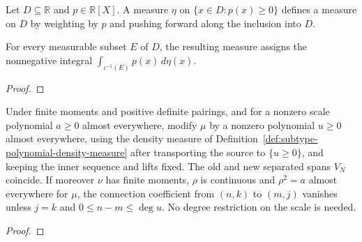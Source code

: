 \begin{supporting}
\begin{definition}
\label{def:subtype-polynomial-density-measure}
\leanok
Let $D\subseteq\mathbb R$ and $p\in\mathbb R[X]$. A measure $\eta$ on
$\{x\in D:p(x)\ge0\}$ defines a measure on $D$ by weighting by $p$ and
pushing forward along the inclusion into $D$.
\end{definition}

\begin{theorem}
\label{thm:subtype-polynomial-density-measure}
\leanok
For every measurable subset $E$ of $D$, the resulting measure assigns the
nonnegative integral $\int_{\iota^{-1}(E)}p(x)\,d\eta(x)$.
\end{theorem}
\begin{proof}
\leanok
\end{proof}
\end{supporting}


\begin{theorem}
\label{thm:koornwinder-type1}
\leanok
Under finite moments and positive definite pairings, and for a nonzero scale
polynomial $a\ge0$ almost everywhere, modify $\mu$ by a nonzero polynomial
$u\ge0$ almost everywhere, using the density measure of Definition~\ref{def:subtype-polynomial-density-measure} after transporting the source to $\{u\ge0\}$, and keeping the inner sequence and lifts fixed. The old
and new separated spans $V_N$ coincide. If moreover $\nu$ has finite moments,
$\rho$ is continuous and $\rho^2=a$ almost everywhere for $\mu$, the connection
coefficient from $(n,k)$ to $(m,j)$ vanishes unless $j=k$ and
$0\le n-m\le\deg u$. No degree restriction on the scale is needed.
\end{theorem}
\begin{proof}
\leanok
\end{proof}

